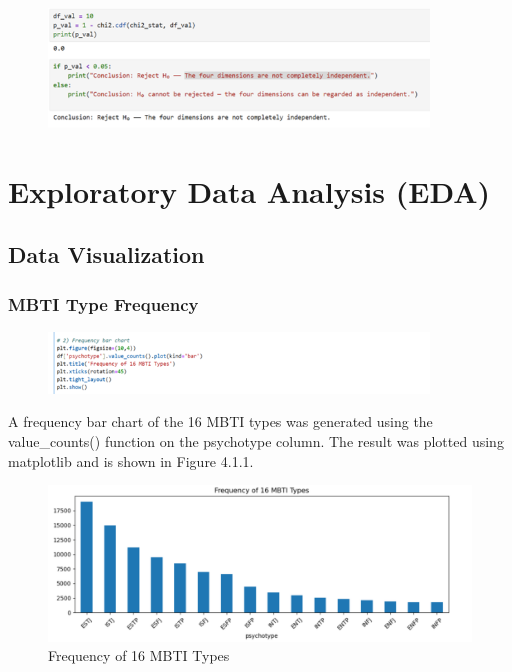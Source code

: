 \documentclass[12pt]{article}
\begin{document}
	\begin{figure}[H]
		\centering
		\includegraphics[width=0.9\textwidth]{Q1P11}
		
	\end{figure}
	
	\section{Exploratory Data Analysis (EDA)}
	\subsection{Data Visualization}
	\subsubsection{MBTI Type Frequency}
	\begin{figure}[H]
		\centering
		\includegraphics[width=0.9\textwidth]{Q1P3EDA1}
		
	\end{figure}
	
	A frequency bar chart of the 16 MBTI types was generated using the value\_counts() function on the psychotype column. The result was plotted using matplotlib and is shown in Figure 4.1.1.
	\begin{figure}[H]
		\centering
		\includegraphics{Q1EDA2} 
		\caption{Frequency of 16 MBTI Types}		
	\end{figure}
	
\end{document}
